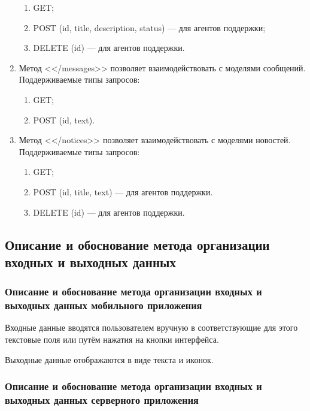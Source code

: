 \documentclass{../includes/TechDoc}
\begin{document}
\begin{enumerate}
        \begin{enumerate}
            \item GET\@;
            \item POST (id, title, description, status) — для агентов поддержки;
            \item DELETE (id) — для агентов поддержки.
        \end{enumerate}
        \item Метод <</messages>> позволяет взаимодействовать с моделями сообщений.\\
        Поддерживаемые типы запросов:
        \begin{enumerate}
            \item GET\@;
            \item POST (id, text)\@.
        \end{enumerate}
        \item Метод <</notices>> позволяет взаимодействовать с моделями новостей.
        Поддерживаемые типы запросов:
        \begin{enumerate}
            \item GET\@;
            \item POST (id, title, text) — для агентов поддержки.
            \item DELETE (id) — для агентов поддержки.
        \end{enumerate}
    \end{enumerate}

    \clearpage

    \subsection{Описание и обоснование метода организации входных и выходных данных}

    \subsubsection{Описание и обоснование метода организации входных и выходных данных мобильного приложения}

    Входные данные вводятся пользователем вручную в соответствующие для этого текстовые поля или путём нажатия на кнопки интерфейса.

    Выходные данные отображаются в виде текста и иконок.

    \subsubsection{Описание и обоснование метода организации входных и выходных данных серверного приложения}
\end{document}
